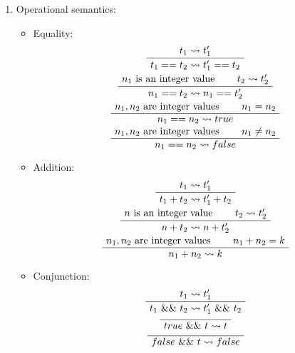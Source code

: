 \begin{exercise}{}
\begin{solution}
\begin{enumerate}
      \item Operational semantics:
      \begin{itemize}
        \item Equality:
          \begin{gather*}
            \AxiomC{\(t_1 \leadsto t_1'\)}
            \UnaryInfC{\(t_1 == t_2 \leadsto t_1' == t_2\)}
            \DisplayProof \\
            \AxiomC{\(n_1\) is an integer value}
            \AxiomC{\(t_2 \leadsto t_2'\)}
            \BinaryInfC{\(n_1 == t_2 \leadsto n_1 == t_2'\)}
            \DisplayProof \\
            \AxiomC{\(n_1, n_2\) are integer values}
            \AxiomC{\(n_1 = n_2\)}
            \BinaryInfC{\(n_1 == n_2 \leadsto true\)}
            \DisplayProof \\
            \AxiomC{\(n_1, n_2\) are integer values}
            \AxiomC{\(n_1 \neq n_2\)}
            \BinaryInfC{\(n_1 == n_2 \leadsto false\)}
            \DisplayProof \\
          \end{gather*}
        \item Addition:
          \begin{gather*}
            \AxiomC{\(t_1 \leadsto t_1'\)}
            \UnaryInfC{\(t_1 + t_2 \leadsto t_1' + t_2\)}
            \DisplayProof \\
            \AxiomC{\(n\) is an integer value}
            \AxiomC{\(t_2 \leadsto t_2'\)}
            \BinaryInfC{\(n + t_2 \leadsto n + t_2'\)}
            \DisplayProof \\
            \AxiomC{\(n_1, n_2\) are integer values}
            \AxiomC{\(n_1 + n_2 = k\)}
            \BinaryInfC{\(n_1 + n_2 \leadsto k\)}
            \DisplayProof
          \end{gather*}
        \item Conjunction:
          \begin{gather*}
            \AxiomC{\(t_1 \leadsto t_1'\)}
            \UnaryInfC{\(t_1 ~\&\& ~t_2 \leadsto t_1' ~\&\& ~t_2\)}
            \DisplayProof \\
            \AxiomC{}
            \UnaryInfC{\(true ~\&\&~ t \leadsto t\)}
            \DisplayProof \\
            \AxiomC{}
            \UnaryInfC{\(false ~\&\&~ t \leadsto false\)}
            \DisplayProof
          \end{gather*}

\end{itemize}
\end{enumerate}
\end{solution}
\end{exercise}
